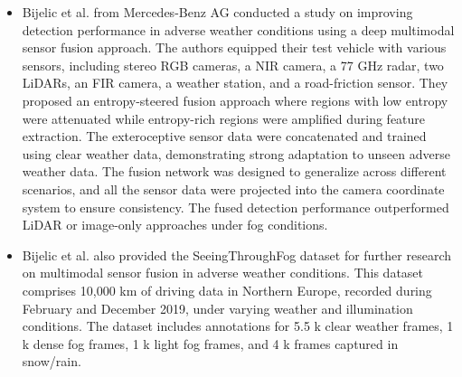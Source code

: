 \documentclass[rnd]{mas_proposal}
\begin{document}
\begin{itemize}
    \item Bijelic et al. \cite{bijelic2020seeing} from Mercedes-Benz AG conducted a study on improving detection performance in adverse weather conditions using a deep multimodal sensor fusion approach. The authors equipped their test vehicle with various sensors, including stereo RGB cameras, a NIR camera, a 77 GHz radar, two LiDARs, an FIR camera, a weather station, and a road-friction sensor. They proposed an entropy-steered fusion approach where regions with low entropy were attenuated while entropy-rich regions were amplified during feature extraction. The exteroceptive sensor data were concatenated and trained using clear weather data, demonstrating strong adaptation to unseen adverse weather data. The fusion network was designed to generalize across different scenarios, and all the sensor data were projected into the camera coordinate system to ensure consistency. The fused detection performance outperformed LiDAR or image-only approaches under fog conditions.
    
    \item Bijelic et al. \cite{bijelic2020seeing} also provided the SeeingThroughFog dataset for further research on multimodal sensor fusion in adverse weather conditions. This dataset comprises 10,000 km of driving data in Northern Europe, recorded during February and December 2019, under varying weather and illumination conditions. The dataset includes annotations for 5.5 k clear weather frames, 1 k dense fog frames, 1 k light fog frames, and 4 k frames captured in snow/rain.
    

\end{itemize}
\end{document}
